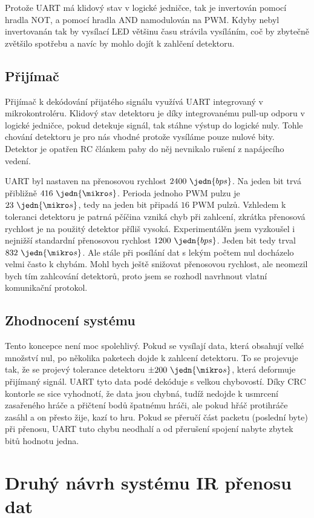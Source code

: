 Protože UART má klidový stav v logické jedničce, tak je invertován pomocí hradla NOT, a pomocí hradla AND namodulován na PWM. Kdyby nebyl invertovanán tak by vysílací LED většinu času strávila vysíláním, coč by zbytečně zvětšilo spotřebu a navíc by mohlo dojít k zahlčení detektoru.

\subsection{Přijímač}
Přijímač k dekódování přijatého signálu využívá UART integrovaný v mikrokontroléru. Klidový stav detektoru je díky integrovanému pull-up odporu v logické jedničce, pokud detekuje signál, tak stáhne výstup do logické nuly. Tohle chování detektoru je pro nás vhodné protože vysíláme pouze nulové bity. Detektor je opatřen RC článkem paby do něj nevnikalo rušení z napájecího vedení.

UART byl nastaven na přenosovou rychlost $2400~\jedn{bps}$. Na jeden bit trvá přibližně $416~\jedn{\mikro s}$. Perioda jednoho PWM pulzu je $23~\jedn{\mikro s}$, tedy na jeden bit připadá $16$ PWM pulzů. Vzhledem k toleranci detektoru je patrná pčíčina vzniká chyb při zahlcení, zkrátka přenosová rychlost je na použitý detektor příliš vysoká. Experimentálěn jsem vyzkoušel i nejnižší standardní přenosovou rychlost $1200~\jedn{bps}$. Jeden bit tedy trval $832~\jedn{\mikro s}$. Ale stále při posílání dat s lekým počtem nul docházelo velmi často k chybám. Mohl bych ještě snižovat přenosovou rychlost, ale neomezil bych tím zahlcování detektorů, proto jsem se rozhodl navrhnout vlatní komunikační protokol.

\subsection{Zhodnocení systému}
Tento koncepce není moc spolehlivý. Pokud se vysílají data, která obsahují velké množství nul, po několika paketech dojde k zahlcení detektoru. To se projevuje tak, že se projevý tolerance detektoru $\pm200~\jedn{\mikro s}$, která deformuje přijímaný signál. UART tyto data podé dekóduje s velkou chybovostí. Díky CRC kontorle se sice vyhodnotí, že data jsou chybná, tudíž nedojde k usmrcení zasařeného hráče a přičtení bodů špatnému hráči, ale pokud hřáč protihráče zasáhl a on přesto žije, kazí to hru. Pokud se přeručí část packetu (poslední byte) při přenosu, UART tuto chybu neodhalí a od přerušení spojení nabyte zbytek bitů hodnotu jedna.


\section{Druhý návrh systému IR přenosu dat}


